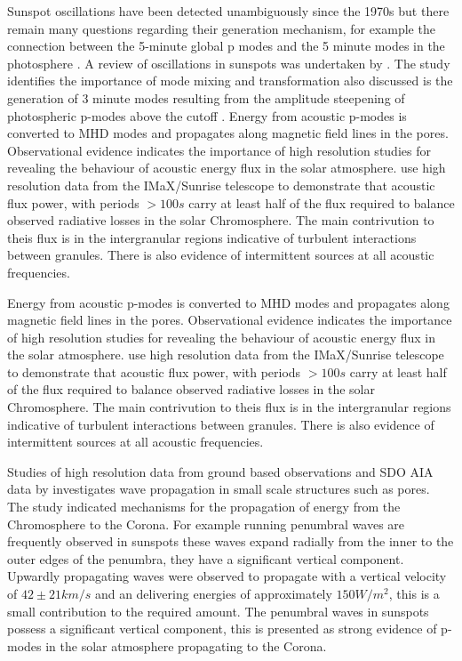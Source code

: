 \documentclass{aa}
\begin{document}
  Sunspot oscillations have been detected unambiguously since the 1970s but there remain many questions regarding their generation mechanism, for example the connection between the 5-minute global p modes and the 5 minute modes in the photosphere  \cite{Penn1993}. A review of oscillations in sunspots was undertaken by  \cite{Bogdan2000}. The study identifies the importance of  mode mixing and transformation also discussed is the generation of 3 minute modes resulting from the amplitude steepening of photospheric p-modes above the cutoff  \cite{Bogdan2006}. Energy from acoustic p-modes is converted to MHD modes and propagates along magnetic field lines in the pores. Observational evidence indicates the importance of high resolution studies for revealing the behaviour of acoustic energy flux in the solar atmosphere. \cite{Bello2010B} use high resolution data from the IMaX/Sunrise telescope to demonstrate that acoustic flux power, with periods $\gt 100s$ carry at least half of the flux required to balance observed radiative losses in the solar Chromosphere. The main contrivution to theis flux is in the intergranular regions indicative of turbulent interactions between granules. There is also evidence of intermittent sources  at all acoustic frequencies.    



 Energy from acoustic p-modes is converted to MHD modes and propagates along magnetic field lines in the pores. Observational evidence indicates the importance of high resolution studies for revealing the behaviour of acoustic energy flux in the solar atmosphere. \cite{Bello2010B} use high resolution data from the IMaX/Sunrise telescope to demonstrate that acoustic flux power, with periods $\gt 100s$ carry at least half of the flux required to balance observed radiative losses in the solar Chromosphere. The main contrivution to theis flux is in the intergranular regions indicative of turbulent interactions between granules. There is also evidence of intermittent sources  at all acoustic frequencies. 

Studies of high resolution data from ground based observations and SDO AIA data by \cite{Freij2014} investigates wave propagation in small scale structures such as pores. The study indicated mechanisms for the  propagation of energy from the Chromosphere to the Corona. For example running penumbral waves are frequently observed in sunspots these waves expand radially from the inner to the outer edges of the penumbra, they have a significant vertical component. Upwardly propagating waves were observed to propagate with a vertical velocity of $42\pm21km/s$ and an delivering energies of approximately $150W/m^2$, this is a small contribution to the required amount. The penumbral waves in sunspots possess a significant vertical component, this is presented as strong evidence  of p-modes in the solar atmosphere  propagating to the Corona.
\end{document}
